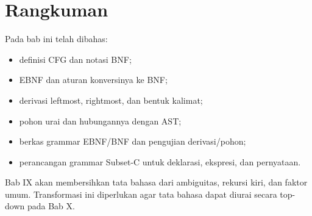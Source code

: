\section*{Rangkuman}

Pada bab ini telah dibahas:
\begin{itemize}[leftmargin=*]
  \item definisi CFG dan notasi BNF;
  \item EBNF dan aturan konversinya ke BNF;
  \item derivasi leftmost, rightmost, dan bentuk kalimat;
  \item pohon urai dan hubungannya dengan AST;
  \item berkas grammar EBNF/BNF dan pengujian derivasi/pohon;
  \item perancangan grammar Subset-C untuk deklarasi, ekspresi, dan
        pernyataan.
\end{itemize}

Bab IX akan membersihkan tata bahasa dari ambiguitas, rekursi kiri,
dan faktor umum. Transformasi ini diperlukan agar tata bahasa dapat
diurai secara top-down pada Bab X.
